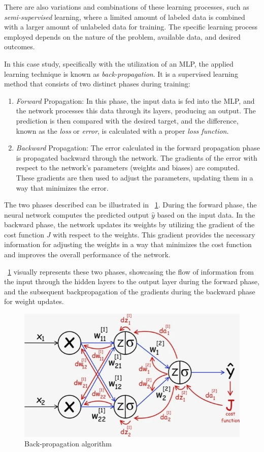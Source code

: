 There are also variations and combinations of these learning processes, such as \textit{semi-supervised} learning, where a limited amount of labeled data is combined with a larger amount of unlabeled data for training. The specific learning process employed depends on the nature of the problem, available data, and desired outcomes.

In this case study, specifically with the utilization of an MLP, the applied learning technique is known as \textit{back-propagation}. It is a supervised learning method that consists of two distinct phases during training:
\begin{enumerate}
	\item \textit{Forward} Propagation: In this phase, the input data is fed into the MLP, and the network processes this data through its layers, producing an output. The prediction is then compared with the desired target, and the difference, known as the \textit{loss} or \textit{error}, is calculated with a proper \textit{loss function}.
	\item \textit{Backward} Propagation: The error calculated in the forward propagation phase is propagated backward through the network. The gradients of the error with respect to the network's parameters (weights and biases) are computed. These gradients are then used to adjust the parameters, updating them in a way that minimizes the error.
\end{enumerate}

The two phases described can be illustrated in \Fig~\ref{fig:backprop}. During the forward phase, the neural network computes the predicted output $\hat{y}$ based on the input data. In the backward phase, the network updates its weights by utilizing the gradient of the cost function $J$ with respect to the weights. This gradient provides the necessary information for adjusting the weights in a way that minimizes the cost function and improves the overall performance of the network.

\Fig~\ref{fig:backprop} visually represents these two phases, showcasing the flow of information from the input through the hidden layers to the output layer during the forward phase, and the subsequent backpropagation of the gradients during the backward phase for weight updates.

\begin{figure}[h]
	\centering
	\includegraphics[width=0.5\linewidth]{ImageFiles/NeuralNetworks/backprop}
	\caption{Back-propagation algorithm \cite{UIBASP}}
	\label{fig:backprop}
\end{figure}

